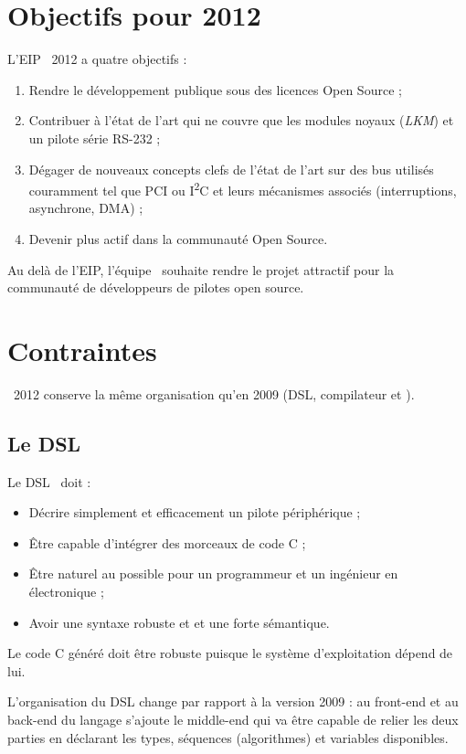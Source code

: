 \documentclass[chapterprefix=off]{rtxreport}
\begin{document}
\chapter{Objectifs pour 2012}

L'EIP \rtx\ 2012 a quatre objectifs :
\begin{enumerate}
\item Rendre le développement publique sous des licences Open Source ;
\item Contribuer à l'état de l'art qui ne couvre que les modules noyaux
(\emph{LKM}) et un pilote série RS-232 ;
\item Dégager de nouveaux concepts clefs de l'état de l'art sur
des bus utilisés couramment tel que PCI ou I\textsuperscript{2}C et leurs
mécanismes associés (interruptions, asynchrone, DMA) ;
\item Devenir plus actif dans la communauté Open Source.
\end{enumerate}

Au delà de l'EIP, l'équipe \rtx\ souhaite rendre le projet attractif pour la
communauté de développeurs de pilotes open source.

\chapter{Contraintes}

\rtx\ 2012 conserve la même organisation qu'en 2009 (DSL, compilateur et \BL).

\section{Le DSL}

Le DSL \rtx\ doit :
\begin{itemize}
\item Décrire simplement et efficacement un pilote périphérique ;
\item Être capable d'intégrer des morceaux de code C ;
\item Être naturel au possible pour un programmeur et un ingénieur en
électronique ;
\item Avoir une syntaxe robuste et et une forte sémantique.
\end{itemize}

Le code C généré doit être robuste puisque le système d'exploitation dépend de lui.

L'organisation du DSL change par rapport à la version 2009 : au front-end et au
back-end du langage s'ajoute le middle-end qui va être capable de relier les
deux parties en déclarant les types, séquences (algorithmes) et variables
disponibles.
\end{document}
